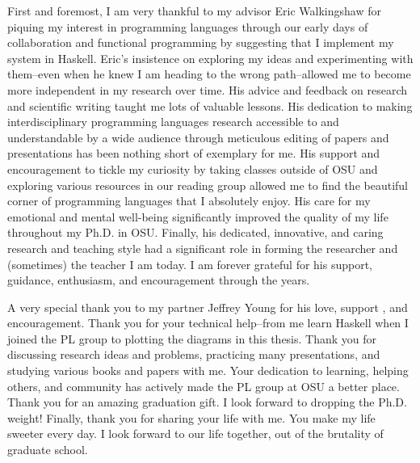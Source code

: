First and foremost, I am very thankful to my advisor Eric Walkingshaw for 
piquing my interest in programming languages through our early days of collaboration
and functional programming by suggesting that I implement my system in Haskell.
%
Eric's insistence on exploring my ideas  and
experimenting with them--even when he knew I am heading 
to the wrong path--allowed me to become more independent in my research over time. 
%
His advice and feedback on research and scientific writing taught me lots of 
valuable lessons. His dedication 
to making interdisciplinary programming languages research accessible
to and understandable by a wide audience through meticulous editing of papers
and presentations has been nothing short of exemplary for me.
%
His support and encouragement to tickle my curiosity by taking classes outside of
OSU and exploring various resources in our reading group allowed me to find the beautiful corner
of programming languages that I absolutely enjoy.
%
His care for my emotional and mental well-being significantly improved the quality 
of my life throughout my Ph.D. in OSU. 
%
Finally, his dedicated, innovative, and caring research and teaching style 
had a significant role in forming the researcher and (sometimes) the teacher I am today. 
%
I am forever grateful for his support, guidance, enthusiasm, and encouragement through 
the years.

%
A very special thank you to my partner Jeffrey Young for his love, support , and encouragement. 
%
Thank you for your technical help--from me learn Haskell when I joined the PL group to plotting the diagrams in this thesis.
Thank you for discussing research ideas and problems,
practicing many presentations, and studying various books and papers with me. 
Your dedication to learning, helping others, and community has actively made the PL group at OSU a better place.
Thank you for an amazing graduation gift. I look forward to dropping the Ph.D. weight! 
Finally, thank you for sharing your life with me. You make my life sweeter every day.
I look forward to our life together, out of the brutality of graduate school. 


